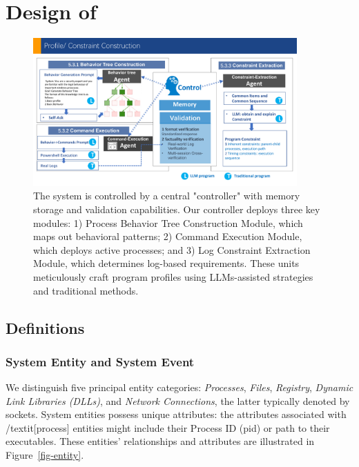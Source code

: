 \section{Design of \tool}

\begin{figure}[h]
    \centering
      \includegraphics[width=0.9\textwidth]{figs/prompt.pdf}
    \caption{The system is controlled by a central "controller" with memory storage and validation capabilities. Our controller deploys three key modules: 1) Process Behavior Tree Construction Module, which maps out behavioral patterns; 2) Command Execution Module, which deploys active processes; and 3) Log Constraint Extraction Module, which determines log-based requirements. These units meticulously craft program profiles using LLMs-assisted strategies and traditional methods.}
    \label{fig-framework-prompt}
    \end{figure}

\subsection{Definitions}

\subsubsection{System Entity and System Event}
We distinguish five principal entity categories: \textit{Processes}, \textit{Files}, \textit{Registry}, \textit{Dynamic Link Libraries (DLLs)}, and \textit{Network Connections}, the latter typically denoted by sockets. System entities possess unique attributes: the attributes associated with /textit[process] entities might include their Process ID (pid) or path to their executables. These entities' relationships and attributes are illustrated in Figure~\ref{fig-entity}. 

